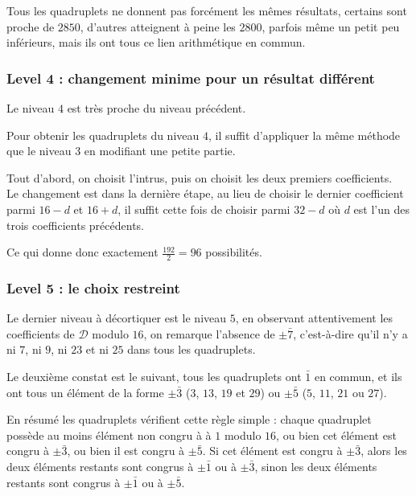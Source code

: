 \documentclass[12pt, a4paper]{memoir}
\begin{document}
  \begin{Remarque}
   Tous les quadruplets ne donnent pas forcément les mêmes résultats, certains sont proche de $2850$, d'autres
   atteignent à peine les $2800$, parfois même un petit peu inférieurs, mais ils ont tous ce lien arithmétique
   en commun.
  \end{Remarque}

  \subsubsection{Level 4 : changement minime pour un résultat différent}
  
  Le niveau $4$ est très proche du niveau précédent.
  
  Pour obtenir les quadruplets du niveau $4$, il suffit d'appliquer la même méthode que le niveau $3$ en 
  modifiant une petite partie.
  
  Tout d'abord, on choisit l'intrus, puis on choisit les deux premiers coefficients. \\
  Le changement est dans la dernière étape, au lieu de choisir le dernier coefficient parmi $16-d$ et 
  $16+d$, il suffit cette fois de choisir parmi $32-d$ où $d$ est l'un des trois coefficients précédents.
  
  Ce qui donne donc exactement $\frac{192}{2} = 96$ possibilités.
  
  \subsubsection{Level 5 : le choix restreint}
  
  Le dernier niveau à décortiquer est le niveau $5$, en observant attentivement les coefficients de $\mathcal{D}$ modulo $16$,
  on remarque l'absence de $\pm \bar{7}$, c'est-à-dire qu'il n'y a ni $7$, ni $9$, ni $23$ et ni $25$ dans tous les quadruplets.
  
  Le deuxième constat est le suivant, tous les quadruplets ont $\bar{1}$ en commun, et ils
  ont tous un élément de la forme $\pm \bar{3}$ ($3$, $13$, $19$ et $29$) ou $\pm \bar{5}$ ($5$, $11$, $21$ ou $27$).
  
  En résumé les quadruplets vérifient cette règle simple : chaque quadruplet possède au moins élément non congru à
  à $1$ modulo $16$, ou bien cet élément est congru à $\pm \bar{3}$, ou bien il est congru à $\pm \bar{5}$.
  Si cet élément est congru à $\pm \bar{3}$, alors les deux éléments restants sont congrus à $\pm \bar{1}$
  ou à $\pm \bar{3}$, sinon les deux éléments restants sont congrus à $\pm \bar{1}$ ou à $\pm \bar{5}$.
 
\end{document}
